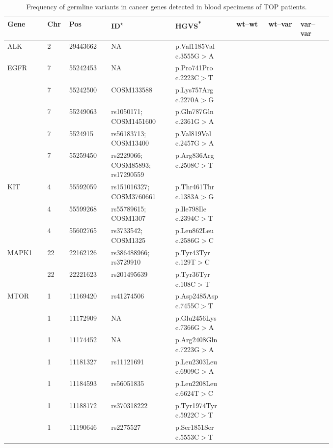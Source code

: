 \begin{longtable}{p{0.1\linewidth}|p{0.02\linewidth}p{0.1\linewidth}p{0.16\linewidth}p{0.15\linewidth}p{0.08\linewidth}p{0.08\linewidth}p{0.08\linewidth}}
\caption{Frequency of germline variants in cancer genes detected in blood specimens of TOP patients.}
\label{tbl:freq_cancer_pgx_genes}
		\\
    \hline
    Gene & Chr & Pos & ID\textsuperscript{$\star$} & HGVS\textsuperscript{*} & wt--wt & wt--var & var--var
		\\
    \hline
		ALK & 2 & 29443662 & NA & p.Val1185Val c.3555G$>$A & & &
		\\
		\hline
		EGFR & 7 & 55242453 & NA & p.Pro741Pro c.2223C$>$T & & &
		\\
		& 7 & 55242500 & COSM133588 & p.Lys757Arg c.2270A$>$G & & &
		\\
		& 7 & 55249063 & rs1050171; COSM1451600 & p.Gln787Gln c.2361G$>$A & & &
		\\
		& 7 & 5524915 & rs56183713; COSM13400 & p.Val819Val c.2457G$>$A & & &
		\\
		& 7 & 55259450 & rs2229066; COSM85893; rs17290559 & p.Arg836Arg c.2508C$>$T & & &
		\\
    \hline
		KIT & 4 & 55592059 & rs151016327; COSM3760661 & p.Thr461Thr c.1383A$>$G & & &
		\\
		& 4 & 55599268 & rs55789615; COSM1307 & p.Ile798Ile c.2394C$>$T & & &
		\\
		& 4 & 55602765 & rs3733542; COSM1325 & p.Leu862Leu c.2586G$>$C & & &
		\\
		\hline
		MAPK1 & 22 & 22162126 & rs386488966; rs3729910 & p.Tyr43Tyr c.129T$>$C & & &
		\\
		& 22 & 22221623 & rs201495639 & p.Tyr36Tyr c.108C$>$T & & &
		\\
		\hline
		MTOR & 1 & 11169420 & rs41274506 & p.Asp2485Asp c.7455C$>$T & & &
		\\
		& 1 & 11172909 & NA & p.Glu2456Lys c.7366G$>$A & & &
		\\
		& 1 & 11174452 & NA & p.Arg2408Gln c.7223G$>$A & & &
		\\
		& 1 & 11181327 & rs11121691 & p.Leu2303Leu c.6909G$>$A & & &
		\\
		& 1 & 11184593 & rs56051835 & p.Leu2208Leu c.6624T$>$C & & &
		\\
		& 1 & 11188172 & rs370318222 & p.Tyr1974Tyr c.5922C$>$T & & &
		\\
		& 1 & 11190646 & rs2275527 & p.Ser1851Ser c.5553C$>$T & & &
		\\

\end{longtable}
